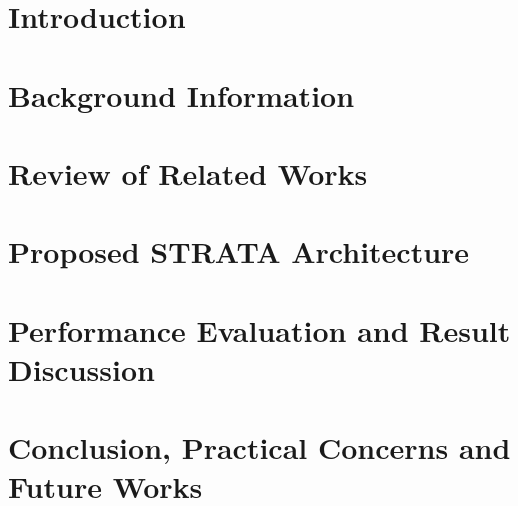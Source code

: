 \documentclass[11pt, onecolumn, oneside, final]{report}
\theoremstyle{plain}          %
\theoremstyle{definition}     %
\begin{document}




%




%
%






%


\chapter{Introduction}


\chapter{Background Information}


\chapter{Review of Related Works}


\chapter{Proposed STRATA Architecture}


\chapter{Performance Evaluation and Result Discussion}


\chapter{Conclusion, Practical Concerns and Future Works}


\clearpage
{}
\large
{}


\end{document}
